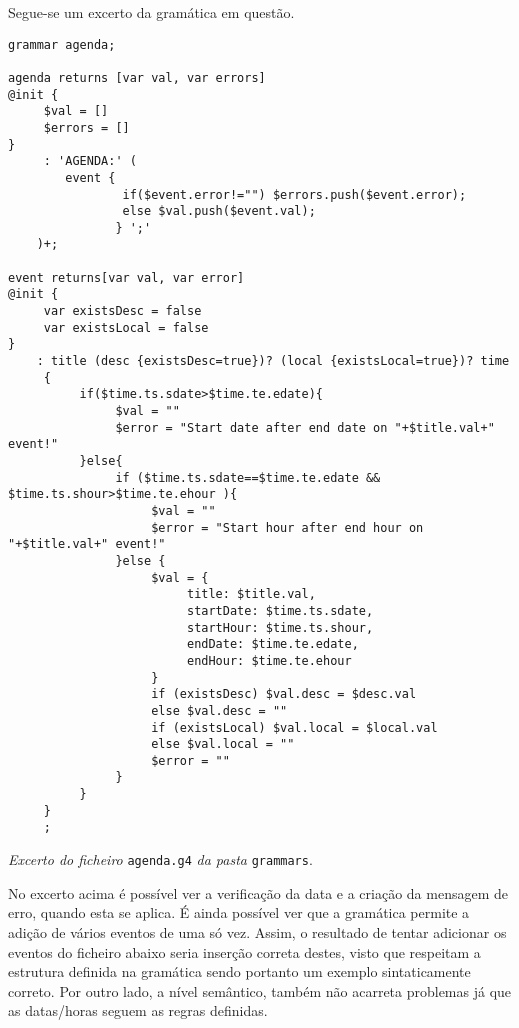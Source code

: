 Segue-se um excerto da gramática em questão.
\begin{framed}
\begin{lstlisting}[language=ANTLR]
grammar agenda;

agenda returns [var val, var errors]
@init {
     $val = []
     $errors = []
}   
     : 'AGENDA:' (
		event {
 				if($event.error!="") $errors.push($event.error);
				else $val.push($event.val);
               } ';'
	)+;

event returns[var val, var error]
@init {
     var existsDesc = false
     var existsLocal = false
}
	: title (desc {existsDesc=true})? (local {existsLocal=true})? time 
     {    
          if($time.ts.sdate>$time.te.edate){
               $val = ""
               $error = "Start date after end date on "+$title.val+" event!"
          }else{
               if ($time.ts.sdate==$time.te.edate && $time.ts.shour>$time.te.ehour ){
                    $val = ""
                    $error = "Start hour after end hour on "+$title.val+" event!"     
               }else {
                    $val = {
                         title: $title.val,
                         startDate: $time.ts.sdate,
                         startHour: $time.ts.shour,
                         endDate: $time.te.edate,
                         endHour: $time.te.ehour
                    }
                    if (existsDesc) $val.desc = $desc.val
                    else $val.desc = ""
                    if (existsLocal) $val.local = $local.val
                    else $val.local = ""
                    $error = ""
               }
          }
     }
     ;
\end{lstlisting}
\end{framed}
\begin{center}
\textit{Excerto do ficheiro} \texttt{agenda.g4} \textit{da pasta} \texttt{grammars}.
\end{center}

No excerto acima é possível ver a verificação da data e a criação da mensagem de erro, quando esta se aplica. É ainda possível ver que a gramática permite a adição de vários eventos de uma só vez. Assim, o resultado de tentar adicionar os eventos do ficheiro abaixo seria  inserção correta destes, visto que respeitam a estrutura definida na gramática sendo portanto um exemplo sintaticamente correto. Por outro lado, a nível semântico, também não acarreta problemas já que as datas/horas seguem as regras definidas.

